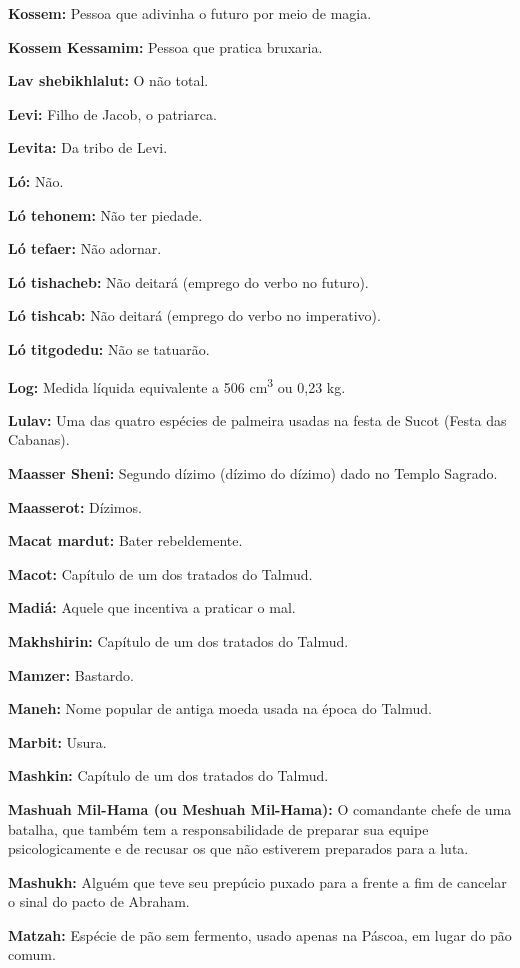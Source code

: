 \begin{hangparas}{.25in}{1}
{\textbf{Kossem:} Pessoa que adivinha o futuro por meio de magia.

\textbf{Kossem Kessamim:} Pessoa que pratica bruxaria.

\textbf{Lav shebikhlalut:} O não total.

\textbf{Levi:} Filho de Jacob, o patriarca.

\textbf{Levita:} Da tribo de Levi.

\textbf{Ló:} Não.

\textbf{Ló tehonem:} Não ter piedade.

\textbf{Ló tefaer:} Não adornar.

\textbf{Ló tishacheb:} Não deitará (emprego do verbo no futuro).

\textbf{Ló tishcab:} Não deitará (emprego do verbo no imperativo).

\textbf{Ló titgodedu:} Não se tatuarão.

\textbf{Log:} Medida líquida equivalente a 506 cm\textsuperscript{3} ou 0,23 kg.

\textbf{Lulav:} Uma das quatro espécies de palmeira usadas na festa de
Sucot (Festa das Cabanas).

\textbf{Maasser Sheni:} Segundo dízimo (dízimo do dízimo) dado no
Templo Sagrado.

\textbf{Maasserot:} Dízimos.

\textbf{Macat mardut:} Bater rebeldemente.

\textbf{Macot:} Capítulo de um dos tratados do Talmud.

\textbf{Madiá:} Aquele que incentiva a praticar o mal.

\textbf{Makhshirin:} Capítulo de um dos tratados do Talmud.

\textbf{Mamzer:} Bastardo.

\textbf{Maneh:} Nome popular de antiga moeda usada na época do Talmud.

\textbf{Marbit:} Usura.

\textbf{Mashkin:} Capítulo de um dos tratados do Talmud.

\textbf{Mashuah Mil-Hama (ou Meshuah Mil-Hama):} O comandante chefe de
uma batalha, que também tem a responsabilidade de preparar sua equipe
psicologicamente e de recusar os que não estiverem preparados para a
luta.

\textbf{Mashukh:} Alguém que teve seu prepúcio puxado para a
frente a fim de cancelar o sinal do pacto de Abraham.

\textbf{Matzah:} Espécie de pão sem fermento, usado apenas na Páscoa, em lugar do pão
comum.

}
\end{hangparas}

